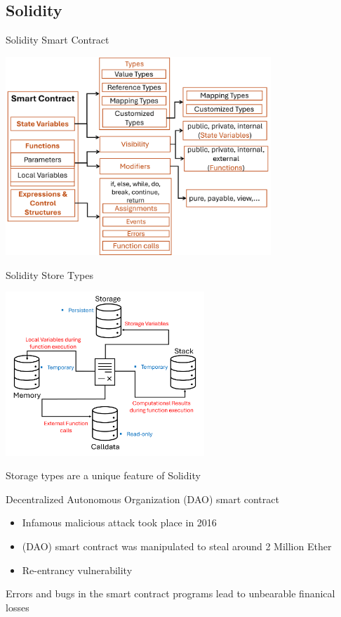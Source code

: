 \documentclass[aspectratio=169]{beamer}
\begin{document}
\subsection{Solidity}
\begin{frame}{Solidity Smart Contract}
	\begin{center}
	\includegraphics[width=10cm,keepaspectratio]{solidityl.PNG}
	\end{center}
\end{frame}
%
\begin{frame}{Solidity Store Types}
	\begin{center}
	\includegraphics[width=7.5cm,keepaspectratio]{datatypes.PNG}
	\end{center}
\begin{exampleblock}{}
  {\large \begin{center}Storage types are a unique feature of Solidity \end{center}}
\end{exampleblock}
\end{frame}
%
\begin{frame}{Decentralized Autonomous Organization (DAO) smart contract}

 \begin{itemize}
\item Infamous malicious attack took place in 2016 
\item (DAO) smart contract was manipulated to steal around 2 Million Ether
\item Re-entrancy vulnerability
\end{itemize}
\vspace{0.5in}
\begin{exampleblock}{}
  {\large \begin{center}Errors and bugs in the smart contract programs lead to unbearable finanical losses \end{center}}
\end{exampleblock}
\end{frame}
\end{document}
